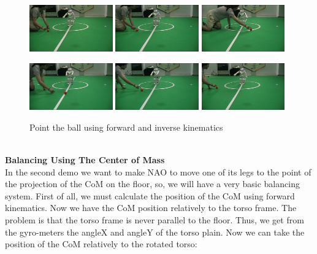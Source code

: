 \begin{figure}[!h]
\centerline{
\includegraphics[width=0.32\textwidth]{Figures/Demo1/1.png}
\includegraphics[width=0.32\textwidth]{Figures/Demo1/2.png}
\includegraphics[width=0.32\textwidth]{Figures/Demo1/3.png}
}
\vspace*{0.06cm}
\centerline{
\includegraphics[width=0.32\textwidth]{Figures/Demo1/4.png}
\includegraphics[width=0.32\textwidth]{Figures/Demo1/5.png}
\includegraphics[width=0.32\textwidth]{Figures/Demo1/6.png}
}
\vspace{-0.1cm}
\caption{Point the ball using forward and inverse kinematics}
\label{demo1}
\vspace*{0.5cm}
\end{figure}\\
\textbf{Balancing Using The Center of Mass}\\
In the second demo we want to make NAO to move one of its legs to the point of the projection of the CoM on the floor, so, we will have a very basic balancing system. First of all, we must calculate the position of the CoM using forward kinematics. Now we have the CoM position relatively to the torso frame. The problem is that the torso frame is never parallel to the floor. Thus, we get from the gyro-meters the angleX and angleY of the torso plain. Now we can take the position of the CoM relatively to the rotated torso:
